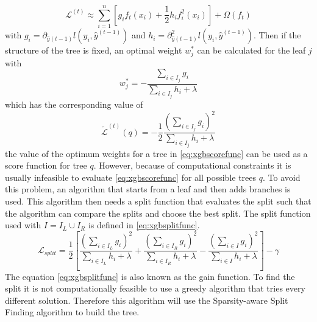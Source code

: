 \begin{equation}
\label{eq:xgbminitailor}
    \mathcal{L}^{(t)} \approx \sum\limits_{i=1}^n[g_if_t(x_i) + \frac{1}{2}h_if_i^2(x_i)] + \Omega(f_t)
\end{equation}
with $g_i = \partial_{\hat{y}(t-1)}l(y_i,\hat{y}^{(t-1)})$ and $h_i = \partial^2_{\hat{y}(t-1)}l(y_i, \hat{y}^{(t-1)})$. Then if the structure of the tree is fixed, an optimal weight $w_j^*$ can be calculated for the leaf $j$ with
$$w_j^* = - \frac{\sum_{i\in I_j}g_i}{\sum_{i \in I_j} h_i + \lambda}$$
which has the corresponding value of 
\begin{equation}
\label{eq:xgbscorefunc}
    \tilde{\mathcal{L}}^{(t)}(q) = - \frac{1}{2} \frac{\left(\sum_{i \in I_j} g_i \right)^2}{\sum_{i \in I_j} h_i + \lambda}
\end{equation}
the value of the optimum weights for a tree in \eqref{eq:xgbscorefunc} can be used as a score function for tree $q$. However, because of computational constraints it is usually infeasible to evaluate \eqref{eq:xgbscorefunc} for all possible trees $q$. To avoid this problem, an algorithm that starts from a leaf and then adds branches is used. This algorithm then needs a split function that evaluates the split such that the algorithm can compare the splits and choose the best split. The split function used with $I = I_L \cup I_R$ is defined in \ref{eq:xgbsplitfunc}. 
\begin{equation}
\label{eq:xgbsplitfunc}
    \mathcal{L}_{split} = \frac{1}{2}\left[ \frac{\left(\sum_{i\in I_L} g_i\right)^2}{\sum_{i\in I_L}h_i + \lambda} + \frac{\left(\sum_{i\in I_R} g_i \right)^2}{\sum_{i\in I_R}h_i + \lambda} - \frac{\left(\sum_{i\in I}g_i\right)^2}{\sum_{i\in I}h_i + \lambda}\right] - \gamma
\end{equation}
The equation \eqref{eq:xgbsplitfunc} is also known as the gain function. To find the split it is not computationally feasible to use a greedy algorithm that tries every different solution. Therefore this algorithm will use the Sparsity-aware Split Finding algorithm \citep{Chen2016XGBoost:System} to build the tree.